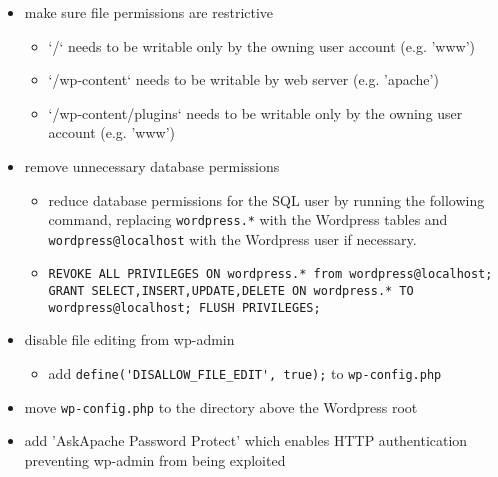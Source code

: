 \begin{itemize}
	\item make sure file permissions are restrictive
	\begin{itemize}
		\item `/` needs to be writable only by the owning user account (e.g. 'www')
		\item `/wp-content` needs to be writable by web server (e.g. 'apache')
		\item `/wp-content/plugins` needs to be writable only by the owning user account (e.g. 'www')
	\end{itemize}

	\item remove unnecessary database permissions
	\begin{itemize}
		\item reduce database permissions for the SQL user by running the following command, replacing \lstinline|wordpress.*| with the Wordpress tables and \lstinline|wordpress@localhost| with the Wordpress user if necessary.
		\item \lstinline|REVOKE ALL PRIVILEGES ON wordpress.* from wordpress@localhost; GRANT SELECT,INSERT,UPDATE,DELETE ON wordpress.* TO wordpress@localhost; FLUSH PRIVILEGES;|
	\end{itemize}

	\item disable file editing from wp-admin
	\begin{itemize}
		\item add \lstinline|define('DISALLOW_FILE_EDIT', true);| to \lstinline|wp-config.php|
	\end{itemize}

	\item move \lstinline|wp-config.php| to the directory above the Wordpress root

	\item add 'AskApache Password Protect' which enables HTTP authentication preventing wp-admin from being exploited
\end{itemize}
